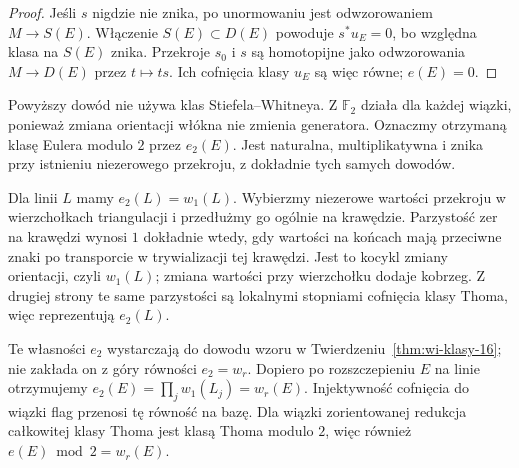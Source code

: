 \begin{proof}
Jeśli $s$ nigdzie
nie znika, po unormowaniu
jest odwzorowaniem
$M\to S(E)$.
Włączenie $S(E)\subset D(E)$
powoduje $s^*u_E=0$,
bo względna klasa
na $S(E)$ znika.
Przekroje $s_0$ i $s$
są homotopijne jako
odwzorowania $M\to D(E)$
przez $t\mapsto ts$.
Ich cofnięcia klasy
$u_E$ są więc równe;
$e(E)=0$.
\end{proof}

\begin{uwaga}
Powyższy dowód nie używa klas Stiefela--Whitneya.
Z $\mathbb F_2$ działa dla każdej wiązki, ponieważ
zmiana orientacji włókna nie zmienia generatora.
Oznaczmy otrzymaną klasę Eulera modulo $2$ przez $e_2(E)$.
Jest naturalna, multiplikatywna i znika przy istnieniu
niezerowego przekroju, z dokładnie tych samych dowodów.

Dla linii $L$ mamy $e_2(L)=w_1(L)$. Wybierzmy
niezerowe wartości przekroju w wierzchołkach triangulacji
i przedłużmy go ogólnie na krawędzie. Parzystość zer
na krawędzi wynosi $1$ dokładnie wtedy, gdy wartości
na końcach mają przeciwne znaki po transporcie
w trywializacji tej krawędzi. Jest to kocykl zmiany
orientacji, czyli $w_1(L)$; zmiana wartości przy
wierzchołku dodaje kobrzeg. Z drugiej strony te same
parzystości są lokalnymi stopniami cofnięcia klasy Thoma,
więc reprezentują $e_2(L)$.

Te własności $e_2$ wystarczają do dowodu wzoru
w Twierdzeniu~\ref{thm:wi-klasy-16}; nie zakłada on
z góry równości $e_2=w_r$. Dopiero po rozszczepieniu
$E$ na linie otrzymujemy
$e_2(E)=\prod_jw_1(L_j)=w_r(E)$.
Injektywność cofnięcia do wiązki flag przenosi
tę równość na bazę. Dla wiązki zorientowanej
redukcja całkowitej klasy Thoma jest klasą Thoma modulo $2$,
więc również $e(E)\bmod2=w_r(E)$.
\end{uwaga}

